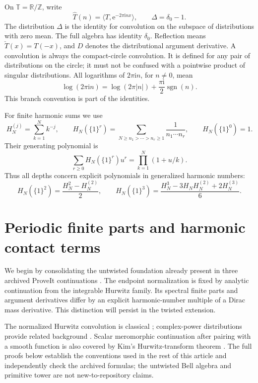 \documentclass[11pt,letterpaper]{article}
\numberwithin{equation}{section}
\theoremstyle{plain}
\theoremstyle{definition}
\theoremstyle{remark}
\newcommand{\bbT}{\mathbb T}
\newcommand{\bbR}{\mathbb R}
\newcommand{\bbZ}{\mathbb Z}
\newcommand{\numi}{\mathrm i}
\newcommand{\rme}{\mathrm e}
\begin{document}
On \(\bbT=\bbR/\bbZ\), write
\[
 \widehat T(n)=\langle T,\rme^{-2\pi\numi n x}\rangle,\qquad
 \Delta=\delta_0-1.
\]
The distribution \(\Delta\) is the identity for convolution on the
subspace of distributions with zero mean. The full algebra has identity
\(\delta_0\). Reflection means
\(\check T(x)=T(-x)\), and \(D\) denotes the distributional argument
derivative. A convolution is always the compact-circle convolution.
It is defined for any pair of distributions on the circle; it must
not be confused with a pointwise product of singular distributions.
All logarithms of \(2\pi\numi n\), for \(n\ne0\), mean
\[
 \log(2\pi\numi n)=\log(2\pi|n|)
                 +\frac{\pi\numi}{2}\operatorname{sgn}(n).
\]
This branch convention is part of the identities.

For finite harmonic sums we use
\[
 H_N^{(j)}=\sum_{k=1}^N k^{-j},\qquad
 H_N(\{1\}^r)=
 \sum_{N\geq n_1>\cdots>n_r\geq1}\frac1{n_1\cdots n_r},
 \qquad H_N(\{1\}^0)=1.
\]
Their generating polynomial is
\[
 \sum_{r\geq0}H_N(\{1\}^r)u^r
      =\prod_{k=1}^N(1+u/k).
\]
Thus all depths concern explicit polynomials in generalized harmonic
numbers:
\[
 H_N(\{1\}^2)=\frac{H_N^2-H_N^{(2)}}2,\qquad
 H_N(\{1\}^3)=\frac{H_N^3-3H_NH_N^{(2)}+2H_N^{(3)}}6.
\]



\section{Periodic finite parts and harmonic contact terms}
\label{per:sec:main}

We begin by consolidating the untwisted foundation already present in
three archived ProveIt continuations
\cite{RepoConvolutionAlgebra,RepoConvolutionCalculus,RepoShiftedJets}.
The endpoint normalization is fixed by analytic continuation from the
integrable Hurwitz family. Its spectral finite parts and argument
derivatives differ by an explicit harmonic-number multiple of a Dirac
mass derivative. This distinction will persist in the twisted extension.

The normalized Hurwitz convolution is classical
\cite[Remark 3.2]{per:Sun}; complex-power distributions provide related
background \cite[Section 5]{per:GaySebbar}. Scalar meromorphic
continuation after pairing with a smooth function is also covered by
Kim's Hurwitz-transform theorem
\cite[Theorem 1 and Corollary 2]{Kim2026}. The full proofs below establish
the conventions used in the rest of this article and independently check
the archived formulas; the untwisted Bell algebra and primitive tower are
not new-to-repository claims.
\end{document}
